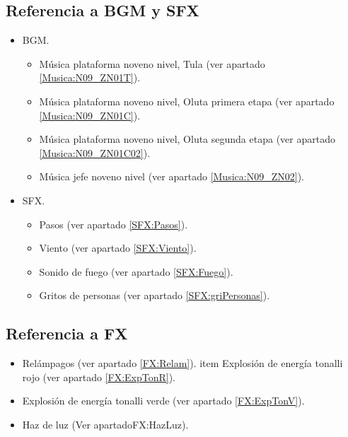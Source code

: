 	\subsection{Referencia a BGM y SFX}
	\begin{itemize}
		\item BGM.
			\begin{itemize}
				\item Música plataforma noveno nivel, Tula (ver apartado \ref{Musica:N09_ZN01T}).
				\item Música plataforma noveno nivel, Oluta primera etapa (ver apartado \ref{Musica:N09_ZN01C}).
				\item Música plataforma noveno nivel, Oluta segunda etapa (ver apartado \ref{Musica:N09_ZN01C02}).
				\item Música jefe noveno nivel (ver apartado \ref{Musica:N09_ZN02}).
			\end{itemize}
		\item SFX.
			\begin{itemize}
				\item Pasos (ver apartado \ref{SFX:Pasos}).
				\item Viento (ver apartado \ref{SFX:Viento}).
				\item Sonido de fuego (ver apartado \ref{SFX:Fuego}).
				\item Gritos de personas (ver apartado \ref{SFX:griPersonas}).
			\end{itemize}
	\end{itemize}
	\subsection{Referencia a FX}
	\begin{itemize}
		\item Relámpagos (ver apartado \ref{FX:Relam}).
		item Explosión de energía tonalli rojo (ver apartado \ref{FX:ExpTonR}).
	\item Explosión de energía tonalli verde (ver apartado \ref{FX:ExpTonV}).
	\item Haz de luz (Ver apartado{FX:HazLuz}).
	\end{itemize}